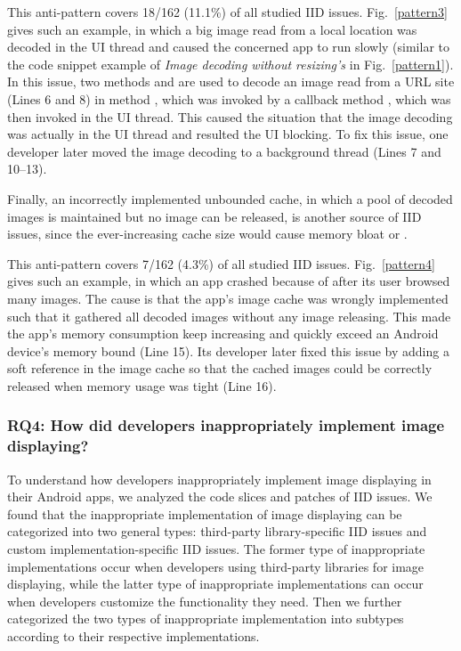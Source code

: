 This anti-pattern covers 18/162 (11.1\%) of all studied IID issues. Fig.~\ref{pattern3} gives such an example, in which a big image read from a local location was decoded in the UI thread and caused the concerned app to run slowly (similar to the code snippet example of \emph{Image decoding without resizing's} in Fig.~\ref{pattern1}). In this issue, two methods  and  are used to decode an image read from a URL site  (Lines 6 and 8) in method , which was invoked by a callback method , which was then invoked in the UI thread. This caused the situation that the image decoding was actually in the UI thread and resulted the UI blocking. To fix this issue, one developer later moved the image decoding to a background thread (Lines 7 and 10--13).

Finally, an incorrectly implemented unbounded cache, in which a pool of decoded images is maintained but no image can be released, is another source of IID issues, since the ever-increasing cache size would cause memory bloat or .

This anti-pattern covers 7/162 (4.3\%) of all studied IID issues. Fig.~\ref{pattern4} gives such an example, in which an app crashed because of  after its user browsed many images. The cause is that the app's image cache  was wrongly implemented such that it gathered all decoded images without any image releasing. This made the app's memory consumption keep increasing and quickly exceed an Android device's memory bound (Line 15). Its developer later fixed this issue by adding a soft reference in the image cache so that the cached images could be correctly released when memory usage was tight (Line 16).

\subsubsection{RQ4: How did developers inappropriately implement image displaying?} \label{subsec:rq4-answer}

To understand how developers inappropriately implement image displaying in their Android apps, we analyzed the code slices and patches of IID issues.
We found that the inappropriate implementation of image displaying can be categorized into two general types: third-party library-specific IID issues and custom implementation-specific IID issues. 
The former type of inappropriate implementations occur when developers using third-party libraries for image displaying, while the latter type of inappropriate implementations can occur when developers customize the functionality they need. Then we further categorized the two types of inappropriate implementation into subtypes according to their respective implementations.

